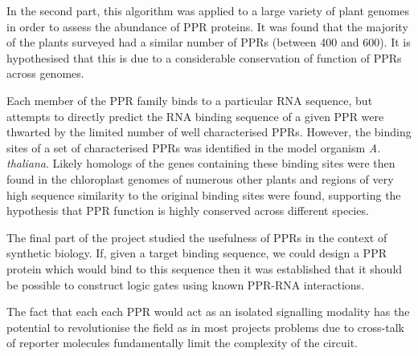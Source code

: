\documentclass[11pt,a4paper, wide, twoside]{IIBproject}
\begin{document}
{In the second part, this algorithm was applied to a large variety of plant 
genomes in order to assess the abundance of PPR proteins.
It was found that the majority of the plants surveyed had a similar number of
PPRs (between 400 and 600).
It is hypothesised that this is due to a considerable conservation of function
of PPRs across genomes.

Each member of the PPR family binds to a particular RNA sequence, but
attempts to directly predict the RNA binding sequence of a given PPR 
were thwarted by the limited number of well characterised PPRs.
However, the binding sites of a set of characterised PPRs was identified in 
the model organism \emph{A. thaliana}.
Likely homologs of the genes containing these binding sites were then found in
the chloroplast genomes of numerous other plants and regions of very high
sequence similarity to the original binding sites were found, supporting the
hypothesis that PPR function is highly conserved across different species.

The final part of the project studied the usefulness of PPRs in the context of
synthetic biology.
If, given a target binding sequence, we could design a PPR protein which would
bind to this sequence then it was established that it should be possible to 
construct logic gates using known PPR-RNA interactions.

The fact that each each PPR would act as an isolated signalling modality has
the potential to revolutionise the field as in most projects problems due to
cross-talk of reporter molecules fundamentally limit the complexity of the
circuit.

}

\clearpage %


\setcounter{tocdepth}{1}
\tableofcontents %

\clearpage %


\pagestyle{mainstyle}

\end{document}
